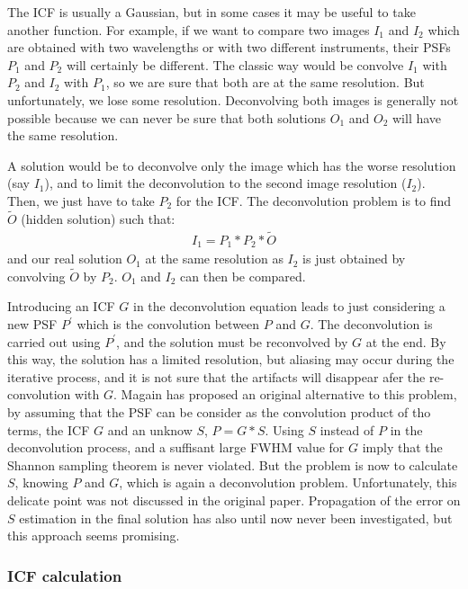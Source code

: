 The ICF is usually a Gaussian, but in some cases it may be useful to
take another function. For example, if we want to compare two images $I_1$ and
$I_2$ which are obtained with 
two wavelengths or with two different instruments,
their PSFs $P_1$ and $P_2$ will certainly be different. The classic way would
be convolve $I_1$ with $P_2$ and $I_2$ with $P_1$, so we are sure that
both are at the same resolution. But unfortunately, we lose some resolution.
Deconvolving both images is generally not possible because we can never be sure
that both solutions $O_1$ and $O_2$ will have the same resolution. 

A solution would be to 
deconvolve only the image which has the worse resolution
(say $I_1$), and to limit the deconvolution to the second image resolution ($I_2$).
Then, we just have to take $P_2$ for the ICF. The deconvolution problem is to
find $\tilde O$ (hidden solution) such that:
\begin{eqnarray}
I_1 = P_1 * P_2 * \tilde O
\end{eqnarray}
and our real solution $O_1$ at the same resolution as $I_2$ is just obtained
by convolving $\tilde O$ by $P_2$. $O_1$ and $I_2$ can then be compared.

Introducing an ICF $G$ in the deconvolution equation leads to
just considering a 
new PSF $P^\prime$ which is the convolution between $P$ and $G$.
The deconvolution is carried out using $P^\prime$, and the solution must be 
reconvolved by $G$ at the end. By this way, the solution has a limited 
resolution, but aliasing may occur during the iterative process, and it is
not sure that the artifacts will disappear afer the re-convolution with $G$.
Magain \cite{rest:magain98} has proposed an original alternative to this
problem, by assuming that the  PSF can be consider as the convolution
product of tho terms, the ICF $G$ and an unknow $S$, $P=G*S$. Using
$S$ instead of $P$ in the deconvolution process, and a suffisant large 
FWHM value for $G$  imply that the Shannon sampling theorem is never
violated. But the problem is now to calculate $S$, knowing $P$ and $G$,
which is again a deconvolution problem. Unfortunately, 
this delicate point was not discussed in the original paper. Propagation of
the error on $S$ estimation in the final solution has also until now never
been investigated, but this approach seems promising.

\subsubsection{ICF calculation}

